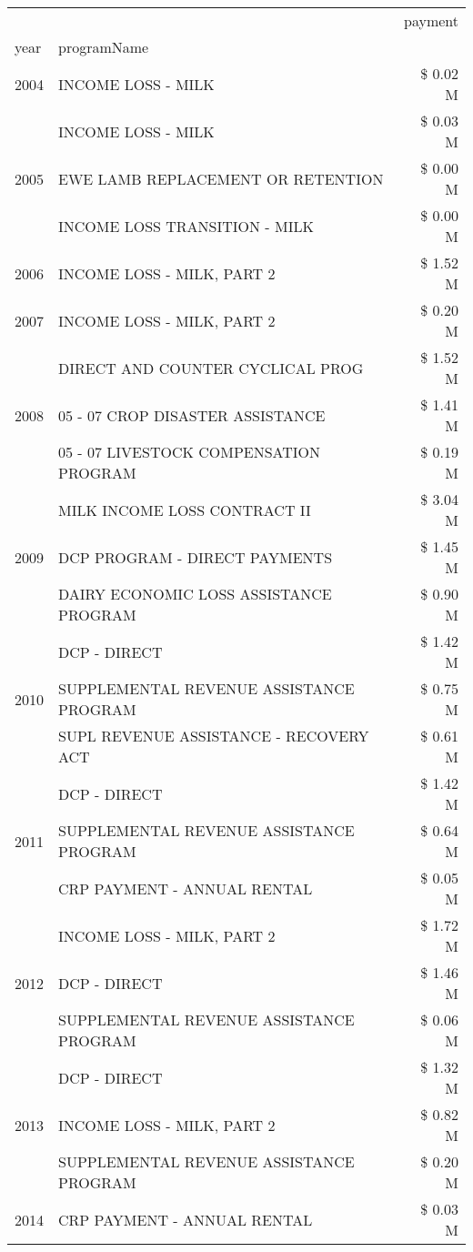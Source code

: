 \begin{tabular}{llr}
\toprule
 &  & payment \\
year & programName &  \\
\midrule
2004 & INCOME LOSS - MILK & \$ 0.02 M \\
\cline{1-3}
\multirow[t]{3}{*}{2005} & INCOME LOSS - MILK & \$ 0.03 M \\
 & EWE LAMB REPLACEMENT OR RETENTION & \$ 0.00 M \\
 & INCOME LOSS TRANSITION - MILK & \$ 0.00 M \\
\cline{1-3}
2006 & INCOME LOSS - MILK, PART 2 & \$ 1.52 M \\
\cline{1-3}
2007 & INCOME LOSS - MILK, PART 2 & \$ 0.20 M \\
\cline{1-3}
\multirow[t]{3}{*}{2008} & DIRECT AND COUNTER CYCLICAL PROG & \$ 1.52 M \\
 & 05 - 07 CROP DISASTER ASSISTANCE & \$ 1.41 M \\
 & 05 - 07 LIVESTOCK COMPENSATION PROGRAM & \$ 0.19 M \\
\cline{1-3}
\multirow[t]{3}{*}{2009} & MILK INCOME LOSS CONTRACT II & \$ 3.04 M \\
 & DCP PROGRAM - DIRECT PAYMENTS & \$ 1.45 M \\
 & DAIRY ECONOMIC LOSS ASSISTANCE PROGRAM & \$ 0.90 M \\
\cline{1-3}
\multirow[t]{3}{*}{2010} & DCP - DIRECT & \$ 1.42 M \\
 & SUPPLEMENTAL REVENUE ASSISTANCE PROGRAM & \$ 0.75 M \\
 & SUPL REVENUE ASSISTANCE - RECOVERY ACT & \$ 0.61 M \\
\cline{1-3}
\multirow[t]{3}{*}{2011} & DCP - DIRECT & \$ 1.42 M \\
 & SUPPLEMENTAL REVENUE ASSISTANCE PROGRAM & \$ 0.64 M \\
 & CRP PAYMENT - ANNUAL RENTAL & \$ 0.05 M \\
\cline{1-3}
\multirow[t]{3}{*}{2012} & INCOME LOSS - MILK, PART 2 & \$ 1.72 M \\
 & DCP - DIRECT & \$ 1.46 M \\
 & SUPPLEMENTAL REVENUE ASSISTANCE PROGRAM & \$ 0.06 M \\
\cline{1-3}
\multirow[t]{3}{*}{2013} & DCP - DIRECT & \$ 1.32 M \\
 & INCOME LOSS - MILK, PART 2 & \$ 0.82 M \\
 & SUPPLEMENTAL REVENUE ASSISTANCE PROGRAM & \$ 0.20 M \\
\cline{1-3}
\multirow[t]{3}{*}{2014} & CRP PAYMENT - ANNUAL RENTAL & \$ 0.03 M \\

\end{tabular}
